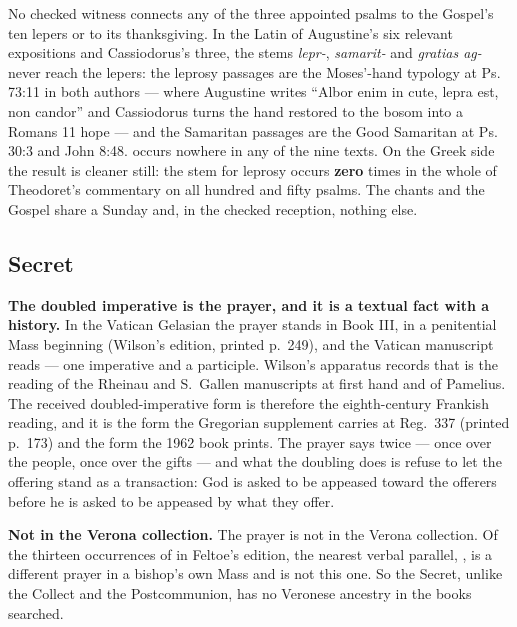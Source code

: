 \begin{witnessnote}
No checked witness connects any of the three appointed psalms to
the Gospel's ten lepers or to its thanksgiving. In the Latin of Augustine's
six relevant expositions and Cassiodorus's three, the stems
\textit{lepr-}, \textit{samarit-} and \textit{gratias ag-} never reach the
lepers: the leprosy passages are the Moses'-hand typology at Ps. 73:11 in both
authors --- where Augustine writes ``Albor enim in cute, lepra est, non
candor'' and Cassiodorus turns the hand restored to the bosom into a Romans 11
hope --- and the Samaritan passages are the Good Samaritan at Ps. 30:3 and John
8:48.  occurs nowhere in any of the nine texts. On the
Greek side the result is cleaner still: the stem for leprosy occurs
\textbf{zero} times in the whole of Theodoret's commentary on all hundred and
fifty psalms. The chants and the Gospel share a Sunday and, in the checked
reception, nothing else.
\end{witnessnote}

\elementguard
\subsection*{Secret }


\textbf{The doubled imperative is the prayer, and it is a textual fact with a
history.} In the Vatican Gelasian the prayer stands in Book III, in a
penitential Mass beginning 
(Wilson's edition, printed p.~249), and the Vatican manuscript reads
 --- one imperative
and a participle. Wilson's apparatus records that  is the reading of the Rheinau and S.\ Gallen manuscripts at first
hand and of Pamelius. The received doubled-imperative form is therefore the
eighth-century Frankish reading, and it is the form the Gregorian supplement
carries at Reg.\ 337 (printed p.~173) and the form the 1962 book prints. The
prayer says  twice --- once over the people, once over the
gifts --- and what the doubling does is refuse to let the offering stand as a
transaction: God is asked to be appeased toward the offerers before he is asked
to be appeased by what they offer.

\textbf{Not in the Verona collection.} The prayer is not in the Verona collection. Of
the thirteen occurrences of  in Feltoe's edition,
the nearest verbal parallel, , is a different prayer in a bishop's own Mass and is not this one.
So the Secret, unlike the Collect and the Postcommunion, has no Veronese
ancestry in the books searched.

